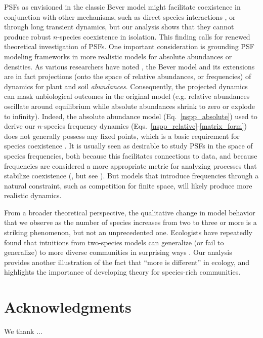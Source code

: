 \documentclass[11pt]{article}
\begin{document}
PSFs as envisioned in the classic Bever model might facilitate coexistence in conjunction with other mechanisms, such as direct species interactions \citep{bever2003soil}, or through long transient dynamics, but our analysis shows that they cannot produce robust $n$-species coexistence in isolation. This finding calls for renewed theoretical investigation of PSFs. One important consideration is grounding PSF modeling frameworks in more realistic models for absolute abundances or densities. As various researchers have noted \citep{kulmatiski2011testing,revilla2013plant,eppinga2018frequency,ke2020effects}, the Bever model and its extensions are in fact projections (onto the space of relative abundances, or frequencies) of dynamics for plant and soil \emph{abundances}. Consequently, the projected dynamics can mask unbiological outcomes in the original model (e.g. relative abundances oscillate around equilibrium while absolute abundances shrink to zero or explode to infinity). Indeed, the absolute abundance model (Eq.~\ref{nspp_absolute}) used to derive our $n$-species frequency dynamics (Eqs.~\ref{nspp_relative}-\ref{matrix_form}) does not generally possess any fixed points, which is a basic requirement for species coexistence \citep{hutson1990existence,hutson1992permanence}. It is usually seen as desirable to study PSFs in the space of species frequencies, both because this facilitates connections to data, and because frequencies are considered a more appropriate metric for analyzing processes that stabilize coexistence (\citet{adler2007niche,eppinga2018frequency}, but see \citet{kandlikar2019winning,ke2020effects}). But models that introduce frequencies through a natural constraint, such as competition for finite space, will likely produce more realistic dynamics.

From a broader theoretical perspective, the qualitative change in model behavior that we observe as the number of species increases from two to three or more is a striking phenomenon, but not an unprecedented one. Ecologists have repeatedly found that intuitions from two-species models can generalize (or fail to generalize) to more diverse communities in surprising ways \citep{strobeck1973n,smale1976differential,barabas2016effect}. Our analysis provides another illustration of the fact that ``more is different'' \citep{anderson1972more} in ecology, and highlights the importance of developing theory for species-rich communities.

\section*{Acknowledgments}
We thank ...
\end{document}
